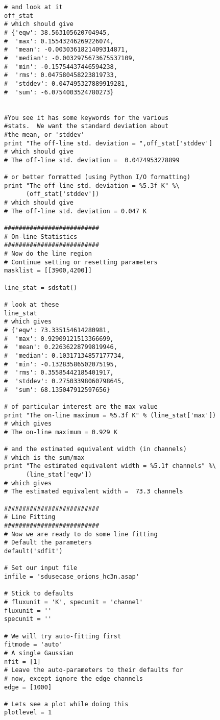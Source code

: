 \begin{verbatim}
# and look at it
off_stat
# which should give
# {'eqw': 38.563105620704945,
#  'max': 0.15543246269226074,
#  'mean': -0.0030361821409314871,
#  'median': -0.0032975673675537109,
#  'min': -0.15754437446594238,
#  'rms': 0.047580458223819733,
#  'stddev': 0.047495327889919281,
#  'sum': -6.0754003524780273}


#You see it has some keywords for the various
#stats.  We want the standard deviation about
#the mean, or 'stddev'
print "The off-line std. deviation = ",off_stat['stddev']
# which should give
# The off-line std. deviation =  0.0474953278899

# or better formatted (using Python I/O formatting)
print "The off-line std. deviation = %5.3f K" %\
      (off_stat['stddev'])
# which should give
# The off-line std. deviation = 0.047 K

##########################
# On-line Statistics
##########################
# Now do the line region
# Continue setting or resetting parameters
masklist = [[3900,4200]]

line_stat = sdstat()

# look at these
line_stat
# which gives
# {'eqw': 73.335154614280981,
#  'max': 0.92909121513366699,
#  'mean': 0.22636228799819946,
#  'median': 0.10317134857177734,
#  'min': -0.13283586502075195,
#  'rms': 0.35585442185401917,
#  'stddev': 0.27503398060798645,
#  'sum': 68.135047912597656}

# of particular interest are the max value
print "The on-line maximum = %5.3f K" % (line_stat['max'])
# which gives
# The on-line maximum = 0.929 K

# and the estimated equivalent width (in channels)
# which is the sum/max
print "The estimated equivalent width = %5.1f channels" %\
      (line_stat['eqw'])
# which gives
# The estimated equivalent width =  73.3 channels

##########################
# Line Fitting
##########################
# Now we are ready to do some line fitting
# Default the parameters
default('sdfit')

# Set our input file
infile = 'sdusecase_orions_hc3n.asap'

# Stick to defaults
# fluxunit = 'K', specunit = 'channel'
fluxunit = ''
specunit = ''

# We will try auto-fitting first
fitmode = 'auto'
# A single Gaussian
nfit = [1]
# Leave the auto-parameters to their defaults for
# now, except ignore the edge channels
edge = [1000]

# Lets see a plot while doing this
plotlevel = 1


\end{verbatim}
